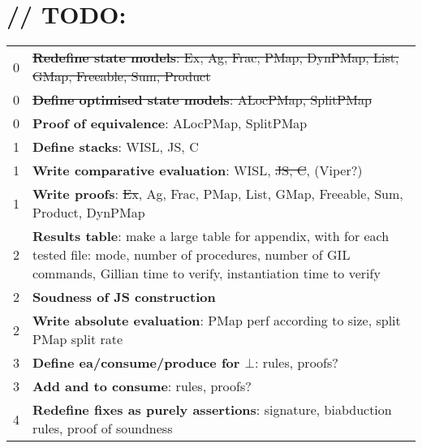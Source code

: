 \chapter{// TODO:}

\begin{tabularx}{\textwidth}{c|X}
	\thead{Priority} & \thead{Name}\\ \hline\hline
	0 & \sout{\textbf{Redefine state models}: Ex, Ag, Frac, PMap, DynPMap, List, GMap, Freeable, Sum, Product} \\ \hline
	0 & \sout{\textbf{Define optimised state models}: ALocPMap, SplitPMap} \\ \hline
	0 & \textbf{Proof of equivalence}: ALocPMap, SplitPMap \\ \hline
	1 & \textbf{Define stacks}: WISL, JS, C \\ \hline
	1 & \textbf{Write comparative evaluation}: WISL, \sout{JS, C}, (Viper?) \\ \hline
	1 & \textbf{Write proofs}: \sout{Ex}, Ag, Frac, PMap, List, GMap, Freeable, Sum, Product, DynPMap \\ \hline
	2 & \textbf{Results table}: make a large table for appendix, with for each tested file: mode, number of procedures, number of GIL commands, Gillian time to verify, instantiation time to verify \\ \hline
	2 & \textbf{Soudness of JS construction} \\ \hline
	2 & \textbf{Write absolute evaluation}: PMap perf according to size, split PMap split rate \\ \hline
	3 & \textbf{Define ea/consume/produce for $\bot$}: rules, proofs? \\ \hline
	3 & \textbf{Add \LFail{} and \Miss{} to consume}: rules, proofs? \\ \hline
	4 & \textbf{Redefine fixes as purely assertions}: signature, biabduction rules, proof of soundness \\ \hline
\end{tabularx}

